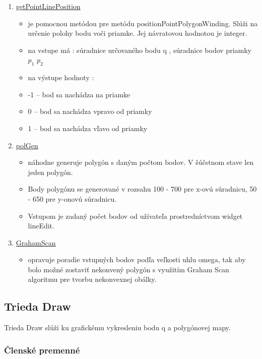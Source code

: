 \documentclass[12pt]{article}
\begin{document}
\begin{enumerate}
\item[] \underline{getPointLinePosition}
\begin{itemize}
\item je pomocnou metódou pre metódu positionPointPolygonWinding. Slúži na určenie polohy bodu voči priamke. Jej návratovou hodnotou je integer.
\item na vstupe má : súradnice určovaného bodu q , súradnice bodov priamky $p_1$ $p_2$
\item na výstupe hodnoty :
\item[] -1 – bod sa nachádza na priamke
\item[] 0 – bod sa nachádza vpravo od priamky
\item[] 1 – bod sa nachádza vľavo od priamky
\end{itemize}
\item[] \underline{polGen}
\begin{itemize}
\item náhodne generuje polygón s daným počtom bodov. V šúčstnom stave len jeden polygón.
\item Body polygónu se generované v rozsahu 100 - 700 pre x-ovú súradnicu, 50 - 650 pre y-onovú súradnicu.
\item Vstupom je zadaný počet bodov od užívateľa prostredníctvom widget lineEdit.
\end{itemize}
\item[] \underline{GrahamScan}
\begin{itemize}
\item opravuje poradie vstupných bodov podľa veľkosti uhlu omega, tak aby bolo možné zostaviť nekonvený polygón s využitím Graham Scan algoritmu pre tvorbu nekonvexnej obálky.
\end{itemize}
\end{enumerate}

\subsection{Trieda Draw}
Trieda Draw slúži ku grafickému vykresleniu bodu q a polygónovej mapy.

\subsubsection{Členské premenné}
\end{document}
